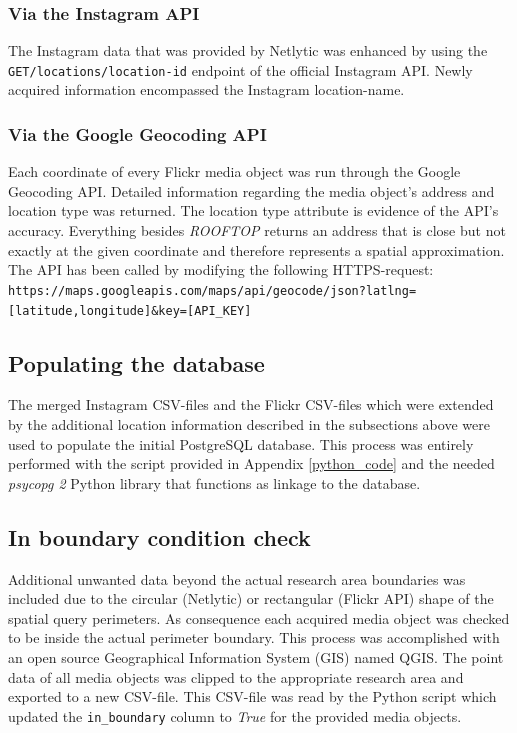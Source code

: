 \subsubsection*{Via the Instagram API} \label{geolocation_via_instagramapi}
The Instagram data that was provided by Netlytic was enhanced by using the \\ \texttt{GET/locations/location-id} endpoint of the official Instagram API. Newly acquired information encompassed the Instagram location-name.

\subsubsection*{Via the Google Geocoding API} \label{geocoding_api}
Each coordinate of every Flickr media object was run through the Google Geocoding API. Detailed information regarding the media object's address and location type was returned. The location type attribute is evidence of the API's accuracy. Everything besides \small{\textit{ROOFTOP}} returns an address that is close but not exactly at the given coordinate and therefore represents a spatial approximation. The API has been called by modifying the following HTTPS-request:\\
\texttt{\footnotesize{https://maps.googleapis.com/maps/api/geocode/json?latlng=[latitude,longitude]\&key=[API\_KEY]}}

\subsection{Populating the database} \label{populate_db}
The merged Instagram CSV-files and the Flickr CSV-files which were extended by the additional location information described in the subsections above were used to populate the initial PostgreSQL database. This process was entirely performed with the script provided in Appendix \ref{python_code} and the needed \textit{psycopg 2} Python library that functions as linkage to the database.

\subsection{In boundary condition check} \label{in_boundary}
Additional unwanted data beyond the actual research area boundaries was included due to the circular (Netlytic) or rectangular (Flickr API) shape of the spatial query perimeters. As consequence each acquired media object was checked to be inside the actual perimeter boundary. This process was accomplished with an open source Geographical Information System (GIS) named QGIS. The point data of all media objects was clipped to the appropriate research area and exported to a new CSV-file. This CSV-file was read by the Python script which updated the \texttt{in\_boundary} column to \textit{True} for the provided media objects.

